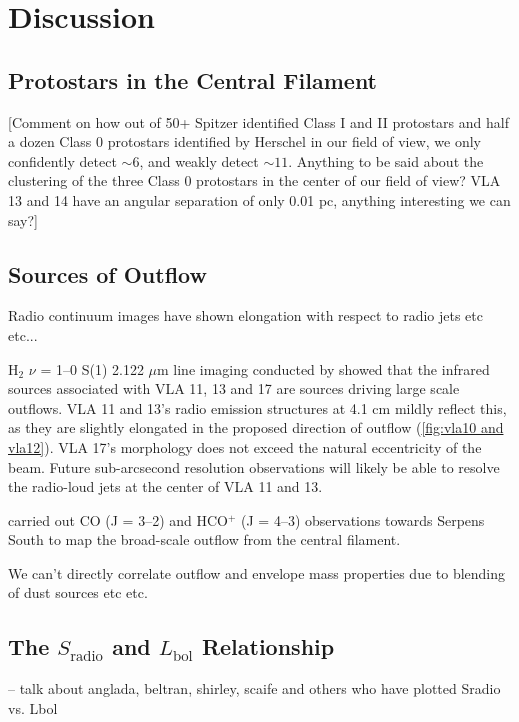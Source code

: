 \documentclass[apj]{emulateapj}
\begin{document}
\section{Discussion}
\label{sec:discussion}

\subsection{Protostars in the Central Filament}
\label{sec:central filament}

[Comment on how out of 50+ Spitzer identified Class I and II protostars and half a dozen Class 0 protostars identified by Herschel in our field of view, we only confidently detect $\sim6$, and weakly detect $\sim11$. Anything to be said about the clustering of the three Class 0 protostars in the center of our field of view? VLA 13 and 14 have an angular separation of only 0.01 pc, anything interesting we can say?]

\subsection{Sources of Outflow}
\label{sec:outflows}
Radio continuum images have shown elongation with respect to radio jets etc etc...

H$_{2}$ $\nu$ = 1--0 S(1) 2.122 $\mu$m line imaging conducted by \citet{Teixeira12} showed that the infrared sources associated with VLA 11, 13 and 17 are sources driving large scale outflows. VLA 11 and 13's radio emission structures at 4.1 cm mildly reflect this, as they are slightly elongated in the proposed direction of outflow (\autoref{fig:vla10 and vla12}). VLA 17's morphology does not exceed the natural eccentricity of the beam. Future sub-arcsecond resolution observations will likely be able to resolve the radio-loud jets at the center of VLA 11 and 13.

\citet{Nakamura11} carried out CO (J = 3--2) and HCO$^{+}$ (J = 4--3) observations towards Serpens South to map the broad-scale outflow from the central filament.  

We can't directly correlate outflow and envelope mass properties due to blending of dust sources etc etc.

\subsection{The $S_{\text{radio}}$ and $L_{\text{bol}}$ Relationship}
\label{sec:correlations}

-- talk about anglada, beltran, shirley, scaife and others who have plotted Sradio vs. Lbol
\end{document}

